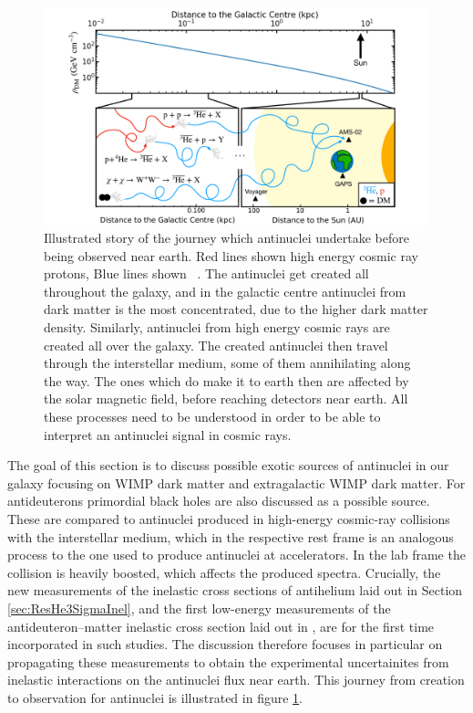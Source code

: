\begin{figure}[h!btp]
    \centering
    \includegraphics[width=\textwidth]{figures/GalaxyStory.pdf}
    \caption{Illustrated story of the journey which antinuclei undertake before being observed near earth. Red lines shown high energy cosmic ray protons, Blue lines shown \ahe\ . The antinuclei get created all throughout the galaxy, and in the galactic centre antinuclei from dark matter is the most concentrated, due to the higher dark matter density. Similarly, antinuclei from high energy cosmic rays are created all over the galaxy. The created antinuclei then travel through the interstellar medium, some of them annihilating along the way. The ones which do make it to earth then are affected by the solar magnetic field, before reaching detectors near earth. All these processes need to be understood in order to be able to interpret an antinuclei signal in cosmic rays.}
    \label{fig:Galaxy_story}
\end{figure}
The goal of this section is to discuss possible exotic sources of antinuclei in our galaxy focusing on WIMP dark matter and extragalactic WIMP dark matter. For antideuterons primordial black holes are also discussed as a possible source. These are compared to antinuclei produced in high-energy cosmic-ray collisions with the interstellar medium, which in the respective rest frame is an analogous process to the one used to produce antinuclei at accelerators. In the lab frame the collision is heavily boosted, which affects the produced spectra. Crucially, the new measurements of the inelastic cross sections of antihelium laid out in Section \ref{sec:ResHe3SigmaInel}, and the first low-energy measurements of the antideuteron--matter inelastic cross section laid out in \cite{antideuteronXS}, are for the first time incorporated in such studies. The discussion therefore focuses in particular on propagating these measurements to obtain the experimental uncertainites from inelastic interactions on the antinuclei flux near earth. This journey from creation to observation for antinuclei is illustrated in figure \ref{fig:Galaxy_story}.\\


